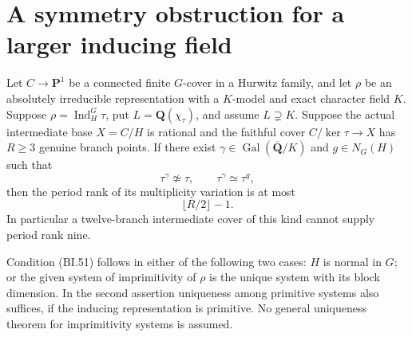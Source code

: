 \section{A symmetry obstruction for a larger inducing field}
\label{sec:inducing-symmetry}

\begin{theorem}
\label{D-BI-15}
Let $C\to\mathbf P^1$ be a connected finite $G$-cover in a
Hurwitz family, and let $\rho$ be an absolutely irreducible
representation with a $K$-model and exact character field $K$.
Suppose $\rho=\operatorname{Ind}_H^G\tau$, put
$L=\mathbf Q(\chi_\tau)$, and assume $L\supsetneq K$.
Suppose the actual intermediate base $X=C/H$ is rational and
the faithful cover $C/\ker\tau\to X$ has $R\ge3$ genuine
branch points.  If there exist
$\gamma\in\operatorname{Gal}(\overline{\mathbf Q}/K)$ and
$g\in N_G(H)$ such that
\[
                 \tau^\gamma\not\simeq\tau,
                 \qquad \tau^\gamma\simeq\tau^g,
                                                               \tag{BI.51}
\]
then the period rank of its multiplicity variation is at most
\[
                         \lfloor R/2\rfloor-1.             \tag{BI.52}
\]
In particular a twelve-branch intermediate cover of this kind
cannot supply period rank nine.

Condition (BI.51) follows in either of the following two cases:
$H$ is normal in $G$; or the given system of imprimitivity of
$\rho$ is the unique system with its block dimension.  In the
second assertion uniqueness among primitive systems also suffices,
if the inducing representation is primitive.  No general
uniqueness theorem for imprimitivity systems is assumed.
\end{theorem}
